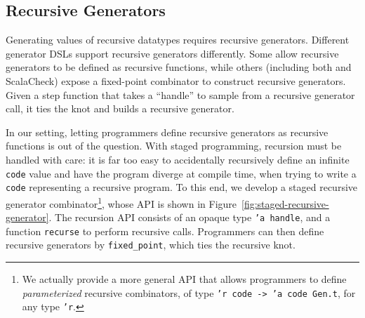 \documentclass[acmsmall]{acmart}
\theoremstyle{definition}
\begin{document}

\subsection{Recursive Generators}
Generating values of recursive datatypes requires recursive generators. Different generator DSLs support recursive generators differently. Some allow recursive generators
to be defined as recursive functions, while others
(including both \bq and ScalaCheck) expose a fixed-point combinator to construct recursive generators.
Given a step function that takes a ``handle'' to sample from a recursive generator call, it
ties the knot and builds a recursive generator.

In our setting, letting programmers define recursive generators as recursive functions is out of the question.
With staged programming, recursion must be handled with care: it is far too easy to accidentally recursively
define an infinite \texttt{code} value and have the program diverge at compile time, when trying to write
a \texttt{code} representing a recursive program.
To this end, we develop a staged recursive generator combinator\footnote{
We actually provide a more general API that allows programmers to define \emph{parameterized}
recursive combinators, of type \texttt{'r code -> 'a code Gen.t}, for any type \texttt{'r}.
}, whose API is shown in Figure~\ref{fig:staged-recursive-generator}.
The recursion API consists of an opaque type \texttt{'a handle}, and a function \texttt{recurse} to perform recursive calls.
Programmers can then define recursive generators by \texttt{fixed\_point}, which ties the recursive knot.



\end{document}
